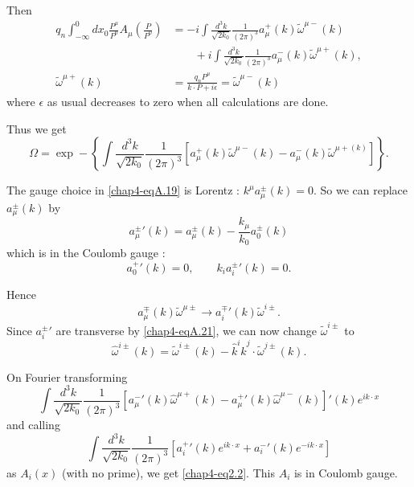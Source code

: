 Then
\begin{align*}
  q_n \int^0_{-\infty} dx_0 \frac{P^\mu}{P^0} A_\mu \left( \frac{P}{P^0}\right) & = -i \int \frac{d^3k}{\sqrt{2k_0}} \frac{1}{(2 \pi)^3} a_\mu^+ (k) \tilde{\omega}^{\mu -} (k)\\
  & \qquad + i \int \frac{d^3k}{\sqrt{2k_0}} \frac{1}{(2 \pi)^3} a_\mu^- (k) \tilde{\omega}^{\mu +}(k), \label{chap4-eqA.17}\tag{A.17}\\
  \tilde{\omega}^{\mu +} (k) & = \frac{q_n P^\mu}{k \cdot P + i\epsilon} = {\tilde{\omega}}^{\mu -} (k) \label{chap4-eqA.18}\tag{A.18}
\end{align*}
where $\epsilon$ as usual decreases to zero when all calculations are done.

Thus we get
\begin{equation*}
\Omega = \exp - \left\{ \int \frac{d^3 k}{\sqrt{2k_0}} \frac{1}{(2 \pi)^3} \left[a_\mu^+ (k) \tilde{\omega}^{\mu -} (k) - a_\mu^- (k) \tilde{\omega}^{\mu + (k)} \right]\right\}. \label{chap4-eqA.19}\tag{A.19}
\end{equation*}

The gauge choice in \eqref{chap4-eqA.19} is Lorentz : $k^\mu a_\mu^{\pm} (k) =0$. So we can replace $a_\mu^{\pm} (k)$ by
\begin{equation*}
{a_\mu^{\pm}}' (k) = a_\mu^{\pm} (k) - \frac{k_\mu}{k_0} a_0^\pm (k) \label{chap4-eqA.20}\tag{A.20}
\end{equation*}
which is in the Coulomb gauge :
\begin{equation*}
  {a_0^{+}}' (k) =0, \qquad k_i {a_i^\pm} ' (k) =0. \label{chap4-eqA.21}\tag{A.21}
\end{equation*}

Hence
\begin{equation*}
a_\mu^{\mp} (k) \tilde{\omega}^{\mu \pm} \to {a_i^{\mp}}' (k) \tilde{\omega}^{i \pm}. \label{chap4-eqA.22}\tag{A.22}
\end{equation*}
Since ${a_i^{\pm}}'$ are transverse by \eqref{chap4-eqA.21}, we can now change $\tilde{\omega}^{i \pm }$ to
\begin{equation*}
\hat{\omega}^{i \pm} (k) = \tilde{\omega}^{i \pm} (k) - \hat{k}^{i} \hat{k}^{j} \cdot \tilde{\omega}^{j \pm}(k). \label{chap4-eqA.23}\tag{A.23}
\end{equation*}

On Fourier transforming
\begin{equation*}
\int \frac{d^3k}{\sqrt{2k_0}} \frac{1}{(2 \pi)^3} \left[ {a_\mu^-}' (k) \hat{\omega}^{\mu +} (k) - {a_\mu^+}' (k) \hat{\omega}^{\mu -} (k)\right]' (k) e^{ik \cdot x} \label{chap4-eqA.24}\tag{A.24}
\end{equation*}
and calling
\begin{equation*}
\int \frac{d^3k}{\sqrt{2k_0}} \frac{1}{(2 \pi)^3} \left[ {a_i^+}' (k) e^{ik \cdot x} + {a_i^-}' (k) e^{-i k \cdot x}\right] \label{chap4-eqA.25}\tag{A.25}
\end{equation*}
as $A_i (x)$ (with no prime), we get \eqref{chap4-eq2.2}. This $A_i$ is in Coulomb gauge.


